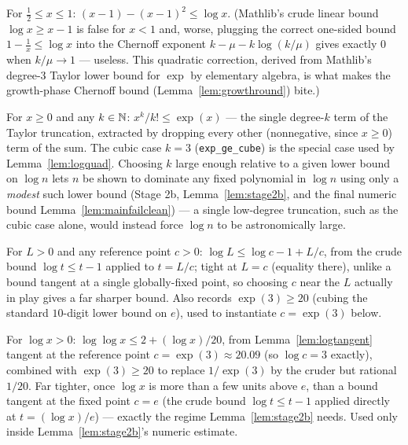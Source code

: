\begin{lemma}\label{lem:logquad}
  \leanok
  For $\tfrac12 \le x \le 1$: $(x-1)-(x-1)^2 \le \log x$. (Mathlib's crude
  linear bound $\log x \ge x-1$ is false for $x<1$ and, worse, plugging the
  correct one-sided bound $1-\tfrac1x\le\log x$ into the Chernoff exponent
  $k-\mu-k\log(k/\mu)$ gives exactly $0$ when $k/\mu\to1$ --- useless. This
  quadratic correction, derived from Mathlib's degree-$3$ Taylor lower bound
  for $\exp$ by elementary algebra, is what makes the growth-phase Chernoff
  bound (Lemma~\ref{lem:growthround}) bite.)
\end{lemma}

\begin{lemma}\label{lem:exppow}
  \leanok
  For $x\ge0$ and any $k\in\mathbb{N}$: $x^k/k! \le \exp(x)$ --- the single
  degree-$k$ term of the Taylor truncation, extracted by dropping every
  other (nonnegative, since $x\ge0$) term of the sum. The cubic case
  $k=3$ (\texttt{exp\_ge\_cube}) is the special case used by
  Lemma~\ref{lem:logquad}. Choosing $k$ large enough relative to a given
  lower bound on $\log n$ lets $n$ be shown to dominate any fixed
  polynomial in $\log n$ using only a \emph{modest} such lower bound
  (Stage 2b, Lemma~\ref{lem:stage2b}, and the final numeric bound
  Lemma~\ref{lem:mainfailclean}) --- a single low-degree truncation, such
  as the cubic case alone, would instead force $\log n$ to be
  astronomically large.
\end{lemma}

\begin{lemma}\label{lem:logtangent}
  \leanok
  For $L>0$ and any reference point $c>0$: $\log L \le \log c - 1 + L/c$,
  from the crude bound $\log t \le t - 1$ applied to $t = L/c$; tight at
  $L=c$ (equality there), unlike a bound tangent at a single globally-fixed
  point, so choosing $c$ near the $L$ actually in play gives a far sharper
  bound. Also records $\exp(3)\ge20$ (cubing the standard $10$-digit lower
  bound on $e$), used to instantiate $c=\exp(3)$ below.
\end{lemma}

\begin{lemma}\label{lem:loglog}
  \leanok
  For $\log x>0$: $\log\log x \le 2 + (\log x)/20$, from
  Lemma~\ref{lem:logtangent} tangent at the reference point
  $c=\exp(3)\approx20.09$ (so $\log c = 3$ exactly), combined with
  $\exp(3)\ge20$ to replace $1/\exp(3)$ by the cruder but rational $1/20$.
  Far tighter, once $\log x$ is more than a few units above $e$, than a
  bound tangent at the fixed point $c=e$ (the crude bound $\log t\le t-1$
  applied directly at $t=(\log x)/e$) --- exactly the regime
  Lemma~\ref{lem:stage2b} needs. Used only inside Lemma~\ref{lem:stage2b}'s
  numeric estimate.
\end{lemma}

